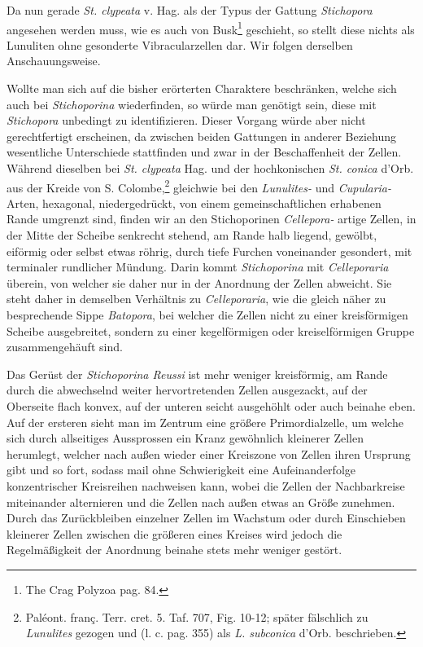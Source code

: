 \documentclass[a4paper, 11pt, oneside, german]{article}
\begin{document}
Da nun gerade \emph{St. clypeata} v. Hag. als der Typus der Gattung \emph{Stichopora} angesehen werden muss, wie es auch von Busk\footnote{The Crag Polyzoa pag. 84.} geschieht, so stellt diese nichts als Lunuliten ohne gesonderte Vibracularzellen dar. Wir folgen derselben Anschauungsweise.

Wollte man sich auf die bisher erörterten Charaktere beschränken, welche sich auch bei \emph{Stichoporina} wiederfinden, so würde man genötigt sein, diese mit \emph{Stichopora} unbedingt zu identifizieren. Dieser Vorgang würde aber nicht gerechtfertigt erscheinen, da zwischen beiden Gattungen in anderer Beziehung wesentliche Unterschiede stattfinden und zwar in der Beschaffenheit der Zellen. Während dieselben bei \emph{St. clypeata} Hag. und der hochkonischen \emph{St. conica} d'Orb. aus der Kreide von S. Colombe,\footnote{Paléont. franç. Terr. cret. 5. Taf. 707, Fig. 10-12; später fälschlich zu \emph{Lunulites} gezogen und (l. c. pag. 355) als \emph{L. subconica} d'Orb. beschrieben.} gleichwie bei den \emph{Lunulites-} und \emph{Cupularia-} Arten, hexagonal, niedergedrückt, von einem gemeinschaftlichen erhabenen Rande umgrenzt sind, finden wir an den Stichoporinen \emph{Cellepora-} artige Zellen, in der Mitte der Scheibe senkrecht stehend, am Rande halb liegend, gewölbt, eiförmig oder selbst etwas röhrig, durch tiefe Furchen voneinander gesondert, mit terminaler rundlicher Mündung. Darin kommt \emph{Stichoporina} mit \emph{Celleporaria} überein, von welcher sie daher nur in der Anordnung der Zellen abweicht. Sie steht daher in demselben Verhältnis zu \emph{Celleporaria}, wie die gleich näher zu besprechende Sippe \emph{Batopora}, bei welcher die Zellen nicht zu einer kreisförmigen Scheibe ausgebreitet, sondern zu einer kegelförmigen oder kreiselförmigen Gruppe zusammengehäuft sind.

Das Gerüst der \emph{Stichoporina Reussi} ist mehr weniger kreisförmig, am Rande durch die abwechselnd weiter hervortretenden Zellen ausgezackt, auf der Oberseite flach konvex, auf der unteren seicht ausgehöhlt oder auch beinahe eben. Auf der ersteren sieht man im Zentrum eine größere Primordialzelle, um welche sich durch allseitiges Aussprossen ein Kranz gewöhnlich kleinerer Zellen herumlegt, welcher nach außen wieder einer Kreiszone von Zellen ihren Ursprung gibt und so fort, sodass mail ohne Schwierigkeit eine Aufeinanderfolge konzentrischer Kreisreihen nachweisen kann, wobei die Zellen der Nachbarkreise miteinander alternieren und die Zellen nach außen etwas an Größe zunehmen. Durch das Zurückbleiben einzelner Zellen im Wachstum oder durch Einschieben kleinerer Zellen zwischen die größeren eines Kreises wird jedoch die Regelmäßigkeit der Anordnung beinahe stets mehr weniger gestört.
\end{document}
